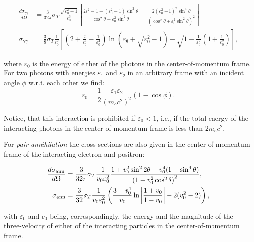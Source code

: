 \begin{equation}
    \begin{aligned}
        \frac{d \sigma_{\gamma\gamma}}{d\Omega} &= \frac{3}{32\pi} \sigma_T 
            \frac{\sqrt{\varepsilon_0^2-1}}{\varepsilon_0^3}
            \left[
                \frac{2 \varepsilon_0^2 -1 + (\varepsilon_0^2 - 1)\sin^2{\theta}}{\cos^2{\theta} + \varepsilon_0^2\sin^2{\theta}}
                - \frac{2(\varepsilon_0^2 - 1)^2\sin^4{\theta}}{\left(\cos^2{\theta}+\varepsilon_0^2 \sin^2{\theta}\right)^2}
            \right] \\
        \sigma_{\gamma\gamma} &= \frac{3}{8}\sigma_T \frac{1}{\varepsilon_0^2}\left[
            \left(2 + \frac{2}{\varepsilon_0^2} - \frac{1}{\varepsilon_0^4}\right)\ln{\left(\varepsilon_0 + \sqrt{\varepsilon_0^2 - 1}\right)} - 
            \sqrt{1 - \frac{1}{\varepsilon_0^2}}\left(1 + \frac{1}{\varepsilon_0^2}\right)
        \right],
    \end{aligned}
\end{equation}

\noindent where $\varepsilon_0$ is the energy of either of the photons in the center-of-momentum frame. For two photons with energies $\varepsilon_1$ and $\varepsilon_2$ in an arbitrary frame with an incident angle $\phi$ w.r.t. each other we find: 
\begin{equation}
    \varepsilon_0 = \frac{1}{2}\frac{\varepsilon_1 \varepsilon_2}{(m_e c^2)^2}\left(1-\cos{\phi}\right).
\end{equation}

\noindent Notice, that this interaction is prohibited if $\varepsilon_0 < 1$, i.e., if the total energy of the interacting photons in the center-of-momentum frame is less than $2m_e c^2$.

For \emph{pair-annihilation} the cross sections are also given in the center-of-momentum frame of the interacting electron and positron:

\begin{equation}
    \begin{aligned}
        \frac{d \sigma_{\rm ann}}{d\Omega} &= \frac{3}{32\pi} \sigma_T \frac{1}{v_0 \varepsilon_0^2}
        \frac{1+v_0^2\sin^2{2\theta} - v_0^4(1 - \sin^4{\theta})}{\left(1 - v_0^2\cos^2{\theta}\right)^2 },\\
        \sigma_{\rm ann} &= \frac{3}{32}\sigma_T \frac{1}{v_0\varepsilon_0^2}
        \left(
            \frac{3-v_0^4}{v_0} \ln{\left|\frac{1+v_0}{1-v_0}\right| + 2(v_0^2 - 2)}
        \right)
        ,
    \end{aligned}
\end{equation}

\noindent with $\varepsilon_0$ and $v_0$ being, correspondingly, the energy and the magnitude of the three-velocity of either of the interacting particles in the center-of-momentum frame.